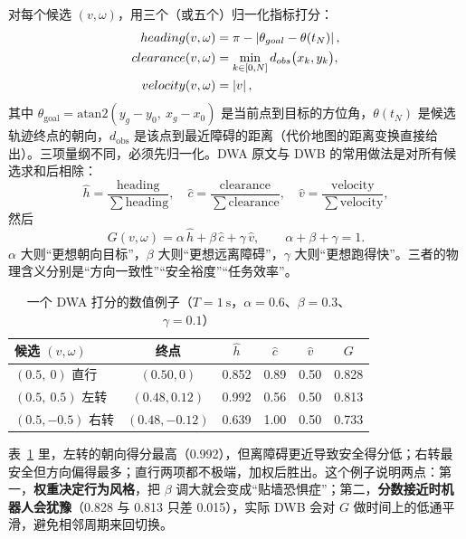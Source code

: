 对每个候选 $(v,\omega)$，用三个（或五个）归一化指标打分：
\begin{align}
  heading(v,\omega) &= \pi-\left\lvert \theta_{goal}-\theta(t_N) \right\rvert, \label{eq:20-heading}\\
  clearance(v,\omega) &= \min_{k\in[0,N]} d_{obs}\bigl(x_k,y_k\bigr), \label{eq:20-clear}\\
  velocity(v,\omega) &= \left\lvert v \right\rvert, \label{eq:20-vel}
\end{align}
其中 $\theta_{\mathrm{goal}}=\mathrm{atan2}(y_g-y_0,\ x_g-x_0)$ 是当前点到目标的方位角，$\theta(t_N)$ 是候选轨迹终点的朝向，$d_{\mathrm{obs}}$ 是该点到最近障碍的距离（代价地图的距离变换直接给出）。三项量纲不同，必须先归一化。DWA 原文与 DWB 的常用做法是对所有候选求和后相除：
\begin{equation}
  \hat h=\frac{\mathrm{heading}}{\sum\mathrm{heading}},\quad
  \hat c=\frac{\mathrm{clearance}}{\sum\mathrm{clearance}},\quad
  \hat v=\frac{\mathrm{velocity}}{\sum\mathrm{velocity}},
\end{equation}
然后
\begin{equation}
  G(v,\omega)=\alpha\,\hat h+\beta\,\hat c+\gamma\,\hat v,\qquad \alpha+\beta+\gamma=1.
  \label{eq:20-G}
\end{equation}
$\alpha$ 大则“更想朝向目标”，$\beta$ 大则“更想远离障碍”，$\gamma$ 大则“更想跑得快”。三者的物理含义分别是“方向一致性”“安全裕度”“任务效率”。

\begin{table}[htbp]
  \centering
  \caption{一个 DWA 打分的数值例子（$T=1\ \mathrm{s}$，$\alpha=0.6$、$\beta=0.3$、$\gamma=0.1$）}
  \label{tab:20-dwa}
  \small
  \begin{tabular}{lccccc}
    \toprule
    候选 $(v,\omega)$ & 终点 & $\hat h$ & $\hat c$ & $\hat v$ & $G$ \\
    \midrule
    $(0.5,\ 0)$ 直行 & $(0.50,0)$ & 0.852 & 0.89 & 0.50 & 0.828 \\
    $(0.5,\ 0.5)$ 左转 & $(0.48,0.12)$ & 0.992 & 0.56 & 0.50 & 0.813 \\
    $(0.5,-0.5)$ 右转 & $(0.48,-0.12)$ & 0.639 & 1.00 & 0.50 & 0.733 \\
    \bottomrule
  \end{tabular}
\end{table}

表~\ref{tab:20-dwa} 里，左转的朝向得分最高（0.992），但离障碍更近导致安全得分低；右转最安全但方向偏得最多；直行两项都不极端，加权后胜出。这个例子说明两点：第一，\textbf{权重决定行为风格}，把 $\beta$ 调大就会变成“贴墙恐惧症”；第二，\textbf{分数接近时机器人会犹豫}（0.828 与 0.813 只差 0.015），实际 DWB 会对 $G$ 做时间上的低通平滑，避免相邻周期来回切换。


